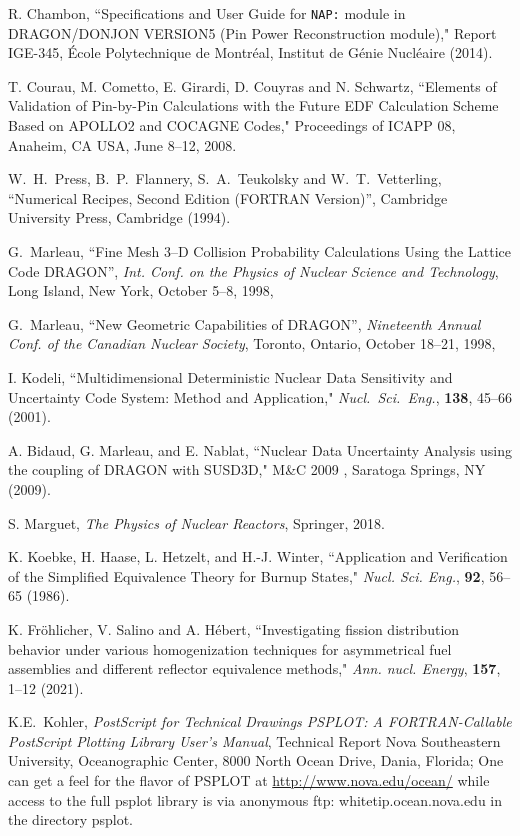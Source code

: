 \begin{thebibliography}{99}
R. Chambon, ``Specifications and User Guide for {\tt NAP:} module in DRAGON/DONJON VERSION5
(Pin Power Reconstruction module)," Report IGE-345,
\'Ecole Polytechnique de Montr\'eal,
 Institut de G\'enie Nucl\'eaire (2014).

T. Courau, M. Cometto, E. Girardi, D. Couyras and N. Schwartz, ``Elements of Validation of Pin-by-Pin Calculations with the Future EDF Calculation Scheme Based on APOLLO2 and COCAGNE Codes," Proceedings of ICAPP 08, Anaheim, CA USA, June 8--12, 2008.

W.~H.~Press, B.~P.~Flannery, S.~A.~Teukolsky and W.~T.~Vetterling, ``Numerical
Recipes, Second Edition (FORTRAN Version)'', Cambridge University Press,
Cambridge (1994).

G.~Marleau, 
``Fine Mesh 3--D Collision Probability Calculations Using the Lattice Code DRAGON'',
\textsl{Int. Conf. on the Physics of Nuclear Science and Technology}, 
Long Island, New York, October 5--8, 1998,

G.~Marleau, ``New Geometric Capabilities of DRAGON'',
\textsl{Nineteenth Annual Conf. of the Canadian Nuclear Society}, 
Toronto, Ontario, October 18--21, 1998,

I. Kodeli, ``Multidimensional Deterministic Nuclear Data Sensitivity and Uncertainty Code System: Method and Application,"
{\sl Nucl.~Sci.~Eng.}, {\bf 138}, 45--66 (2001).

A. Bidaud, G. Marleau, and E. Nablat, ``Nuclear Data Uncertainty Analysis using the coupling of DRAGON with SUSD3D," M\&C 2009 , Saratoga Springs, NY (2009).

S. Marguet, {\sl The Physics of Nuclear Reactors}, Springer, 2018.

K. Koebke, H. Haase, L. Hetzelt, and H.-J. Winter, ``Application and Verification of the Simplified Equivalence Theory
for Burnup States," {\sl Nucl. Sci. Eng.}, {\bf 92}, 56--65 (1986).

K. Fr\"{o}hlicher, V. Salino and A. H\'ebert, ``Investigating fission distribution behavior under various
homogenization techniques for asymmetrical fuel assemblies and different reflector equivalence methods,"
{\sl Ann. nucl. Energy}, {\bf 157}, 1--12 (2021).

K.E.~Kohler, 
\textsl{PostScript for Technical Drawings PSPLOT: A FORTRAN-Callable PostScript Plotting
Library User's Manual}, 
Technical Report Nova Southeastern University, Oceanographic
Center, 8000 North Ocean Drive, Dania, Florida; One can get a feel for the flavor of
PSPLOT at \url{http://www.nova.edu/ocean/} while access to the full psplot library is via
anonymous ftp: whitetip.ocean.nova.edu in the directory psplot. 


\end{thebibliography}
